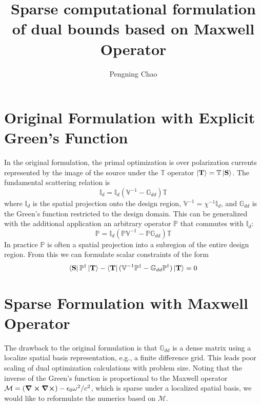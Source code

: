 \documentclass[12pt]{article}
\newcommand\G{\mathbb{G}}
\newcommand\T{\mathbb{T}}
\newcommand\V{\mathbb{V}}
\newcommand\I{\mathbb{I}}
\newcommand\Proj{\mathbb{P}}
\newcommand\M{\mathcal{M}}
\newcommand\eps{\epsilon}
\newcommand\om{\omega}
\begin{document}
\title{Sparse computational formulation of dual bounds based on Maxwell Operator}
\author{Pengning Chao}
\maketitle

\section{Original Formulation with Explicit Green's Function}
In the original formulation, the primal optimization is over polarization currents represented by the image of the source under the $\T$ operator $\ket{\vb{T}}=\T \ket{\vb{S}}$. The fundamental scattering relation is
\begin{equation}
\I_d = \I_d(\V^{-1} - \G_{dd}) \T
\end{equation}
where $\I_d$ is the spatial projection onto the design region, $\V^{-1} = \chi^{-1} \I_d$, and $\G_{dd}$ is the Green's function restricted to the design domain. This can be generalized with the additional application an arbitrary operator $\Proj$ that commutes with $\I_d$:
\begin{equation}\label{eq:proj_scatter}
\Proj = \I_d (\Proj\V^{-1} - \Proj\G_{dd}) \T
\end{equation}
In practice $\Proj$ is often a spatial projection into a subregion of the entire design region. From this we can formulate scalar constraints of the form
\begin{equation}
\bra{\vb{S}}\Proj^\dagger\ket{\vb{T}} - \bra{\vb{T}}(\V^{-1}\Proj^\dagger - \G_{dd}\Proj^\dagger)\ket{\vb{T}} = 0
\end{equation}

\section{Sparse Formulation with Maxwell Operator}
The drawback to the original formulation is that $\G_{dd}$ is a dense matrix using a localize spatial basis representation, e.g., a finite difference grid. This leads poor scaling of dual optimization calculations with problem size. Noting that the inverse of the Green's function is proportional to the Maxwell operator $\M=(\curl\curl) - \eps_0 \om^2/c^2$, which is sparse under a localized spatial basis, we would like to reformulate the numerics based on $\M$. 
\end{document}
